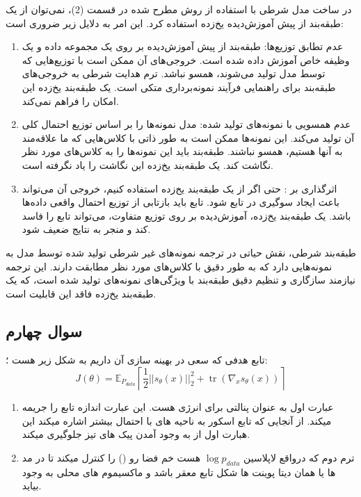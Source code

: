 در ساخت مدل شرطی با استفاده از روش مطرح شده در قسمت (2)، نمی‌توان از یک طبقه‌بند از پیش آموزش‌دیده یخ‌زده  استفاده کرد. این امر به دلایل زیر ضروری است:
\begin{enumerate}

\item  عدم تطابق توزیع‌ها: طبقه‌بند از پیش آموزش‌دیده بر روی یک مجموعه داده و یک وظیفه خاص آموزش داده شده است. خروجی‌های آن ممکن است با توزیع‌هایی که توسط مدل  تولید می‌شوند، همسو نباشد. ترم هدایت شرطی به خروجی‌های طبقه‌بند برای راهنمایی فرآیند نمونه‌برداری متکی است. یک طبقه‌بند یخ‌زده این امکان را فراهم نمی‌کند.

\item  عدم همسویی با نمونه‌های تولید شده: مدل  نمونه‌ها را بر اساس توزیع احتمال کلی آن تولید می‌کند. این نمونه‌ها ممکن است به طور ذاتی با کلاس‌هایی که ما علاقه‌مند به آنها هستیم، همسو نباشند. طبقه‌بند باید این نمونه‌ها را به کلاس‌های مورد نظر نگاشت کند. یک طبقه‌بند یخ‌زده این نگاشت را یاد نگرفته است.

\item  اثرگذاری بر : حتی اگر از یک طبقه‌بند یخ‌زده استفاده کنیم، خروجی آن می‌تواند باعث ایجاد سوگیری در تابع  شود. تابع  باید بازتابی از توزیع احتمال واقعی داده‌ها باشد. یک طبقه‌بند یخ‌زده، آموزش‌دیده بر روی توزیع متفاوت، می‌تواند تابع  را فاسد کند و منجر به نتایج ضعیف شود.
\end{enumerate}


طبقه‌بند شرطی، نقش حیاتی در ترجمه نمونه‌های غیر شرطی تولید شده توسط مدل  به نمونه‌هایی دارد که به طور دقیق با کلاس‌های مورد نظر مطابقت دارند. این ترجمه نیازمند سازگاری و تنظیم دقیق طبقه‌بند با ویژگی‌های نمونه‌های تولید شده است، که یک طبقه‌بند یخ‌زده فاقد این قابلیت است.

\subsection{سوال چهارم}
تابع هدفی که سعی در بهینه سازی آن داریم به شکل زیر هست ؛:
\begin{equation*}
    J(\theta) = \mathbb{E}_{P_{data}} \left\lceil \frac{1}{2} ||s_\theta (x)||^2_2 +\operatorname{tr}(\nabla_x s_\theta(x))\right\rceil 
\end{equation*}
\begin{enumerate}
    \item عبارت اول به عنوان پنالتی برای انرژی هست. این عبارت اندازه تابع  را جریمه میکند. از آنجایی که تابع اسکور به ناحیه های با احتمال بیشتر اشاره میکند این هبارت اول از به وجود آمدن پیک های تیز جلوگیری میکند.
    \item ترم دوم که درواقع لاپلاسین $\log p_{data}$ هست خم فضا رو () را کنترل میکند تا در مد ها یا همان دیتا پوینت ها شکل تابع معقر باشد و ماکسیموم های محلی به وجود بیاید.
\end{enumerate}



